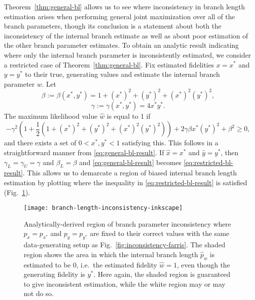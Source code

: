 Theorem~\ref{thm:general-bl} allows us to see where inconsistency in branch length estimation arises when performing general joint maximization over all of the branch parameters, though its conclusion is a statement about both the inconsistency of the internal branch estimate as well as about poor estimation of the other branch parameter estimates.
To obtain an analytic result indicating where only the internal branch parameter is inconsistently estimated, we consider a restricted case of Theorem~\ref{thm:general-bl}.
Fix estimated fidelities $x=x^*$ and $y=y^*$ to their true, generating values and estimate the internal branch parameter $w$.
Let
\[
\beta := \beta(x^*, y^*) = 1+(x^*)^2+(y^*)^2+(x^*)^2(y^*)^2,
\]
\[
\gamma := \gamma(x^*, y^*) = 4x^*y^*.
\]
The maximum likelihood value $\hat{w}$ is equal to 1 if
\begin{equation}
\label{eq:restricted-bl-result}
-\gamma^2\left(1 + \frac{1}{2}\left(1+(x^*)^2+(y^*)^2+(x^*)^2(y^*)^2\right)\right) + 2\gamma\beta x^*(y^*)^2 + \beta^2 \ge 0,
\end{equation}
and there exists a set of $0 < x^*, y^* < 1$ satisfying this.
This follows in a straightforward manner from \eqref{eq:general-bl-result}.
If $\hat{x}=x^*$ and $\hat{y}=y^*$, then $\gamma_{L} = \gamma_{U} = \gamma$ and $\beta_{L} = \beta$ and \eqref{eq:general-bl-result} becomes \eqref{eq:restricted-bl-result}.
This allows us to demarcate a region of biased internal branch length estimation by plotting where the inequality in \eqref{eq:restricted-bl-result} is satisfied (Fig.~\ref{fig:bl-inconsistency}).

\begin{figure}
\centering
\texttt{[image: branch-length-inconsistency-inkscape]}
\caption{Analytically-derived region of branch parameter inconsistency where $p_x=p_{x^*}$ and $p_y=p_{y^*}$ are fixed to their correct values with the same data-generating setup as Fig.~\ref{fig:inconsistency-farris}.
The shaded region shows the area in which the internal branch length $\hat{p}_w$ is estimated to be 0, i.e.\ the estimated fidelity $\hat{w} = 1$, even though the generating fidelity is $y^*$.
Here again, the shaded region is guaranteed to give inconsistent estimation, while the white region may or may not do so.}
\label{fig:bl-inconsistency}
\end{figure}

